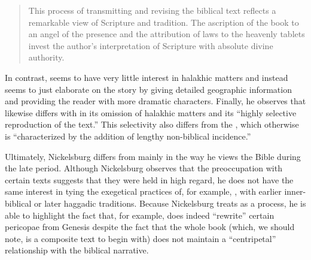 \begin{quote}
    This process of transmitting and revising the biblical text reflects a remarkable view of Scripture and tradition. The \psgraphic ascription of the book to an angel of the presence and the attribution of laws to the heavenly tablets invest the author's interpretation of Scripture with absolute divine authority.%
    \autocite[101]{nickelsburg_stone1984}
\end{quote} 

In contrast, \ga seems to have very little interest in halakhic matters and instead seems to just elaborate on the story by giving detailed geographic information and providing the reader with more dramatic characters.%
    \autocite[106]{nickelsburg_stone1984}
Finally, he observes that \lab likewise differs with \jub in its omission of halakhic matters and its ``highly selective reproduction of the text.''%
    \autocite[110]{nickelsburg_stone1984}
This selectivity also differs from the \ga, which otherwise is ``characterized by the addition of lengthy non-biblical incidence.''%
    \autocite[110]{nickelsburg_stone1984} 

Ultimately, Nickelsburg differs from \vermes mainly in the way he views the Bible during the late \secondtemple period. Although Nickelsburg observes that the preoccupation with certain texts suggests that they were held in high regard, he does not have the same interest in tying the exegetical practices of, for example, \jub, with earlier inner-biblical or later haggadic traditions. Because Nickelsburg treats \rwb as a process, he is able to highlight the fact that, for example, \firstenoch does indeed ``rewrite'' certain pericopae from Genesis despite the fact that the whole book (which, we should note, is a composite text to begin with) does not maintain a ``centripetal'' relationship with the biblical narrative. 

